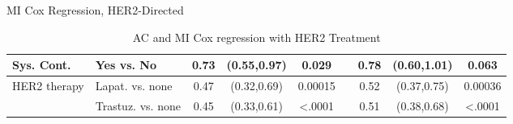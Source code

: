 \begin{frame}{MI Cox Regression, HER2-Directed}
\begin{table}[]
{\begin{tabular}{|l|l|c|c|c|c|c|c|c|}
Sys. Cont.                     & Yes vs. No                       & 0.73                  & (0.55,0.97)                                        & 0.029                 &                       & 0.78 & (0.60,1.01)                                                          & 0.063                                                       \\ \hline
\rowcolor{red}
HER2 therapy                   & Lapat. vs. none                   & 0.47                  & (0.32,0.69)                                        & 0.00015               &                       & 0.52 & (0.37,0.75)                                                          & 0.00036                                                     \\ \hline
\rowcolor{red}

                               & Trastuz. vs. none                 & 0.45                  & (0.33,0.61)                                        & \textless.0001        &                       & 0.51 & (0.38,0.68)                                                          & \textless.0001                                              \\ \hline
\end{tabular}
}
\caption{AC and MI Cox regression with HER2 Treatment}

\end{table}
\end{frame}